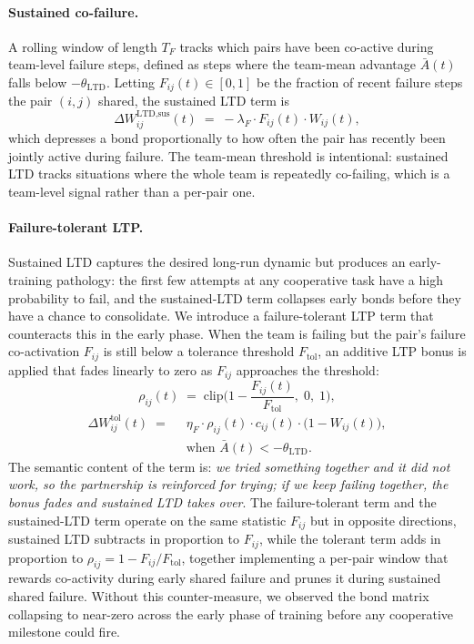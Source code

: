 \paragraph{Sustained co-failure.}
A rolling window of length $T_F$ tracks which pairs have been co-active during team-level failure steps, defined as steps where the team-mean advantage $\bar{A}(t)$ falls below $-\theta_{\text{LTD}}$. Letting $F_{ij}(t) \in [0, 1]$ be the fraction of recent failure steps the pair $(i, j)$ shared, the sustained LTD term is
\[
\Delta W^{\text{LTD,sus}}_{ij}(t) \;=\; -\lambda_F \cdot F_{ij}(t) \cdot W_{ij}(t),
\]
which depresses a bond proportionally to how often the pair has recently been jointly active during failure. The team-mean threshold is intentional: sustained LTD tracks situations where the whole team is repeatedly co-failing, which is a team-level signal rather than a per-pair one.

\paragraph{Failure-tolerant LTP.}
Sustained LTD captures the desired long-run dynamic but produces an early-training pathology: the first few attempts at any cooperative task have a high probability to fail, and the sustained-LTD term collapses
early bonds before they have a chance to consolidate. We introduce a
failure-tolerant LTP term that counteracts this in the early phase. When
the team is failing but the pair's failure co-activation $F_{ij}$ is still
below a tolerance threshold $F_{\text{tol}}$, an additive LTP bonus is
applied that fades linearly to zero as $F_{ij}$ approaches the threshold:
\[
\rho_{ij}(t) \;=\; \mathrm{clip}\!\Big(1 - \frac{F_{ij}(t)}{F_{\text{tol}}},\; 0,\; 1\Big),
\]
\begin{align*}
\Delta W^{\text{tol}}_{ij}(t) \;=\;\; & \eta_F \cdot \rho_{ij}(t) \cdot c_{ij}(t) \cdot \big(1 - W_{ij}(t)\big), \\
                                       & \text{when } \bar{A}(t) < -\theta_{\text{LTD}}.
\end{align*}
The semantic content of the term is: \emph{we tried something together and
it did not work, so the partnership is reinforced for trying; if we keep
failing together, the bonus fades and sustained LTD takes over}. The
failure-tolerant term and the sustained-LTD term operate on the same
statistic $F_{ij}$ but in opposite directions, sustained LTD subtracts
in proportion to $F_{ij}$, while the tolerant term adds in proportion to
$\rho_{ij} = 1 - F_{ij}/F_{\text{tol}}$, together implementing a
per-pair window that rewards co-activity during early shared failure and
prunes it during sustained shared failure. Without this counter-measure,
we observed the bond matrix collapsing to near-zero across the early
phase of training before any cooperative milestone could fire.

